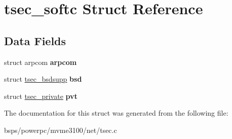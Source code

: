 \hypertarget{structtsec__softc}{}\section{tsec\+\_\+softc Struct Reference}
\label{structtsec__softc}
\subsection*{Data Fields}
\begin{DoxyCompactItemize}
\item 
\mbox{\label{structtsec__softc_a1f08b53a228a8475541baa08e02a8e62}} 
struct arpcom {\bfseries arpcom}
\item 
\mbox{\label{structtsec__softc_a1da4ebea9fc6d3d035cd2048549187ed}} 
struct \mbox{\hyperlink{structtsec__bsdsupp}{tsec\+\_\+bsdsupp}} {\bfseries bsd}
\item 
\mbox{\label{structtsec__softc_a3a068fca17da3ee9bec7d8296b60db11}} 
struct \mbox{\hyperlink{structtsec__private}{tsec\+\_\+private}} {\bfseries pvt}
\end{DoxyCompactItemize}


The documentation for this struct was generated from the following file\+:\begin{DoxyCompactItemize}
\item 
bsps/powerpc/mvme3100/net/tsec.\+c\end{DoxyCompactItemize}
